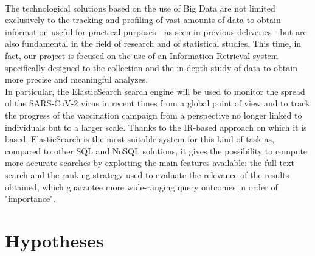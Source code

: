 \documentclass[a4paper,12pt]{article}
\begin{document}
\paragraph{}The technological solutions based on the use of Big Data are not limited exclusively to the tracking and profiling of vast amounts of data to obtain information useful for practical purposes - as seen in previous deliveries - but are also fundamental in the field of research and of statistical studies. This time, in fact, our project is focused on the use of an Information Retrieval system specifically designed to the collection and the in-depth study of data to obtain more precise and meaningful analyzes. \\
In particular, the ElasticSearch search engine will be used to monitor the spread of the SARS-CoV-2 virus in recent times from a global point of view and to track the progress of the vaccination campaign from a perspective no longer linked to individuals but to a larger scale. Thanks to the IR-based approach on which it is based, ElasticSearch is the most suitable system for this kind of task as, compared to other SQL and NoSQL solutions, it gives the possibility to compute more accurate searches by exploiting the main features available: the full-text search and the ranking strategy used to evaluate the relevance of the results obtained, which guarantee more wide-ranging query outcomes in order of "importance".
\section{Hypotheses}
\end{document}
